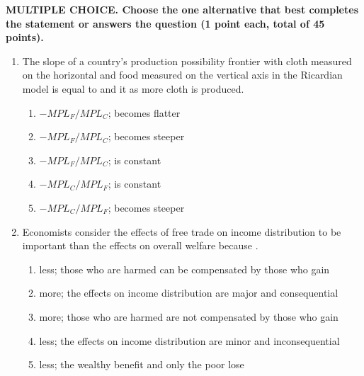 \documentclass[12pt]{article}
\begin{document}
\vspace{1em}

\textbf{MULTIPLE CHOICE. Choose the one alternative that best completes the statement or answers the question (1 point each, total of 45 points).}

\vspace{1em}


\begin{enumerate}[label=\textbf{\arabic*.}]

\item The slope of a country's production possibility frontier with cloth measured on the horizontal and food measured on the vertical axis in the Ricardian model is equal to \underline{\hspace{2em}} and it \underline{\hspace{2em}} as more cloth is produced.
\begin{enumerate}[label=\Alph*.]
\item $-MPL_F/MPL_C$; becomes flatter
\item $-MPL_F/MPL_C$; becomes steeper
\item $-MPL_F/MPL_C$; is constant
\item $-MPL_C/MPL_F$; is constant
\item $-MPL_C/MPL_F$; becomes steeper
\end{enumerate}

\item Economists consider the effects of free trade on income distribution to be \underline{\hspace{2em}} important than the effects on overall welfare because \underline{\hspace{2em}}.
\begin{enumerate}[label=\Alph*.]
\item less; those who are harmed can be compensated by those who gain
\item more; the effects on income distribution are major and consequential
\item more; those who are harmed are not compensated by those who gain
\item less; the effects on income distribution are minor and inconsequential
\item less; the wealthy benefit and only the poor lose
\end{enumerate}


\end{enumerate}
\end{document}
